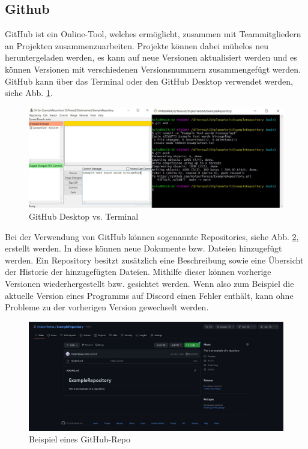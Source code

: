 \subsection{Github } 
GitHub ist ein Online-Tool, welches ermöglicht, zusammen mit Teammitgliedern an Projekten zusammenzuarbeiten. Projekte können dabei mühelos neu heruntergeladen werden, es kann auf neue Versionen aktualisiert werden und es können Versionen mit verschiedenen Versionsnummern zusammengefügt werden. GitHub kann über das Terminal oder den GitHub Desktop verwendet werden, siehe Abb. \ref{fig:impl:gitHubTerminalVSGUI}.


\begin{figure}[h t]
\centering
\includegraphics[scale=0.45]{pics/githubTerminalGUI.png}
\caption{GitHub Desktop vs. Terminal}
\label{fig:impl:gitHubTerminalVSGUI}
\end{figure}


Bei der Verwendung von GitHub können sogenannte Repositories, siehe Abb. \ref{fig:impl:githubRepository}, erstellt werden. In diese können neue Dokumente bzw. Dateien hinzugefügt werden. Ein Repository besitzt zusätzlich eine Beschreibung sowie eine Übersicht der Historie der hinzugefügten Dateien. Mithilfe dieser können vorherige Versionen wiederhergestellt bzw. gesichtet werden. Wenn also zum Beispiel die aktuelle Version eines Programms auf Discord einen Fehler enthält, kann ohne Probleme zu der vorherigen Version gewechselt werden.




\begin{figure}[h t]
\centering
\includegraphics[scale=0.38]{pics/exampleRepository.jpg}
\caption{Beispiel eines GitHub-Repo}
\label{fig:impl:githubRepository}
\end{figure}


